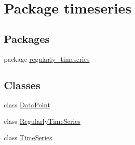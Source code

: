 \hypertarget{namespacetimeseries}{}\section{Package timeseries}
\label{namespacetimeseries}
\subsection*{Packages}
\begin{DoxyCompactItemize}
\item 
package \hyperlink{namespacetimeseries_1_1regularly__timeseries}{regularly\+\_\+timeseries}
\end{DoxyCompactItemize}
\subsection*{Classes}
\begin{DoxyCompactItemize}
\item 
class \hyperlink{classtimeseries_1_1_data_point}{Data\+Point}
\item 
class \hyperlink{classtimeseries_1_1_regularly_time_series}{Regularly\+Time\+Series}
\item 
class \hyperlink{classtimeseries_1_1_time_series}{Time\+Series}
\end{DoxyCompactItemize}
